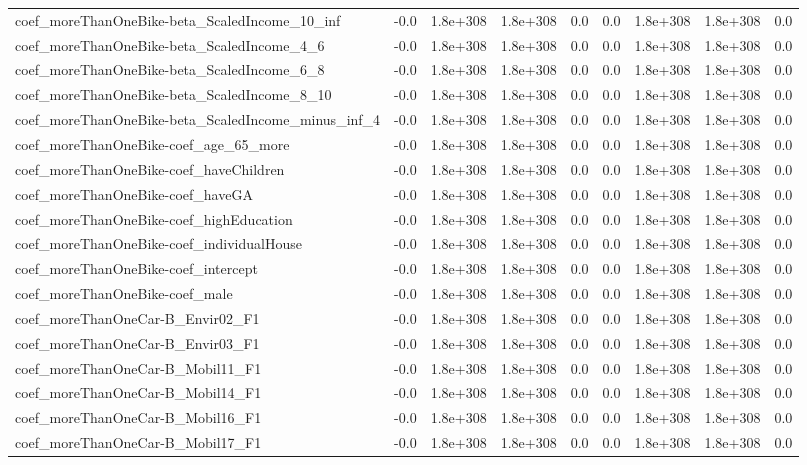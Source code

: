 \begin{tabular}{lrrrrrrrr}
coef_moreThanOneBike-beta_ScaledIncome_10_inf & -0.0 & 1.8e+308 & 1.8e+308 & 0.0 & 0.0 & 1.8e+308 & 1.8e+308 & 0.0 \\
coef_moreThanOneBike-beta_ScaledIncome_4_6 & -0.0 & 1.8e+308 & 1.8e+308 & 0.0 & 0.0 & 1.8e+308 & 1.8e+308 & 0.0 \\
coef_moreThanOneBike-beta_ScaledIncome_6_8 & -0.0 & 1.8e+308 & 1.8e+308 & 0.0 & 0.0 & 1.8e+308 & 1.8e+308 & 0.0 \\
coef_moreThanOneBike-beta_ScaledIncome_8_10 & -0.0 & 1.8e+308 & 1.8e+308 & 0.0 & 0.0 & 1.8e+308 & 1.8e+308 & 0.0 \\
coef_moreThanOneBike-beta_ScaledIncome_minus_inf_4 & -0.0 & 1.8e+308 & 1.8e+308 & 0.0 & 0.0 & 1.8e+308 & 1.8e+308 & 0.0 \\
coef_moreThanOneBike-coef_age_65_more & -0.0 & 1.8e+308 & 1.8e+308 & 0.0 & 0.0 & 1.8e+308 & 1.8e+308 & 0.0 \\
coef_moreThanOneBike-coef_haveChildren & -0.0 & 1.8e+308 & 1.8e+308 & 0.0 & 0.0 & 1.8e+308 & 1.8e+308 & 0.0 \\
coef_moreThanOneBike-coef_haveGA & -0.0 & 1.8e+308 & 1.8e+308 & 0.0 & 0.0 & 1.8e+308 & 1.8e+308 & 0.0 \\
coef_moreThanOneBike-coef_highEducation & -0.0 & 1.8e+308 & 1.8e+308 & 0.0 & 0.0 & 1.8e+308 & 1.8e+308 & 0.0 \\
coef_moreThanOneBike-coef_individualHouse & -0.0 & 1.8e+308 & 1.8e+308 & 0.0 & 0.0 & 1.8e+308 & 1.8e+308 & 0.0 \\
coef_moreThanOneBike-coef_intercept & -0.0 & 1.8e+308 & 1.8e+308 & 0.0 & 0.0 & 1.8e+308 & 1.8e+308 & 0.0 \\
coef_moreThanOneBike-coef_male & -0.0 & 1.8e+308 & 1.8e+308 & 0.0 & 0.0 & 1.8e+308 & 1.8e+308 & 0.0 \\
coef_moreThanOneCar-B_Envir02_F1 & -0.0 & 1.8e+308 & 1.8e+308 & 0.0 & 0.0 & 1.8e+308 & 1.8e+308 & 0.0 \\
coef_moreThanOneCar-B_Envir03_F1 & -0.0 & 1.8e+308 & 1.8e+308 & 0.0 & 0.0 & 1.8e+308 & 1.8e+308 & 0.0 \\
coef_moreThanOneCar-B_Mobil11_F1 & -0.0 & 1.8e+308 & 1.8e+308 & 0.0 & 0.0 & 1.8e+308 & 1.8e+308 & 0.0 \\
coef_moreThanOneCar-B_Mobil14_F1 & -0.0 & 1.8e+308 & 1.8e+308 & 0.0 & 0.0 & 1.8e+308 & 1.8e+308 & 0.0 \\
coef_moreThanOneCar-B_Mobil16_F1 & -0.0 & 1.8e+308 & 1.8e+308 & 0.0 & 0.0 & 1.8e+308 & 1.8e+308 & 0.0 \\
coef_moreThanOneCar-B_Mobil17_F1 & -0.0 & 1.8e+308 & 1.8e+308 & 0.0 & 0.0 & 1.8e+308 & 1.8e+308 & 0.0 \\

\end{tabular}
